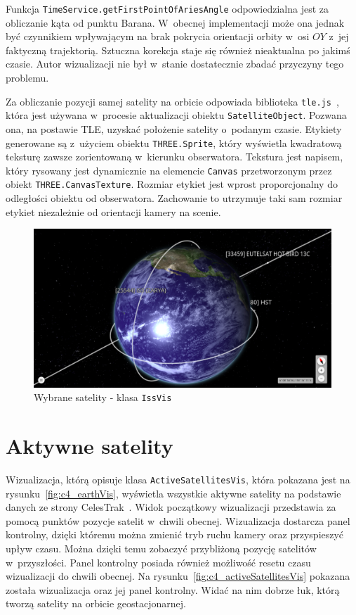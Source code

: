 Funkcja \texttt{TimeService.getFirstPointOfAriesAngle} odpowiedzialna jest za obliczanie kąta od punktu Barana. W~obecnej implementacji może ona jednak być czynnikiem wpływającym na brak pokrycia orientacji orbity w~osi $OY$ z~jej faktyczną trajektorią. Sztuczna korekcja staje się również nieaktualna po jakimś czasie. Autor wizualizacji nie był w~stanie dostatecznie zbadać przyczyny tego problemu. 

Za obliczanie pozycji samej satelity na orbicie odpowiada biblioteka \texttt{tle.js}~\cite{tle.js}, która jest używana w~procesie aktualizacji obiektu \texttt{SatelliteObject}. Pozwana ona, na postawie TLE, uzyskać położenie satelity o~podanym czasie. Etykiety generowane są z~użyciem obiektu \texttt{THREE.Sprite}, który wyświetla kwadratową teksturę zawsze zorientowaną w~kierunku obserwatora. Tekstura jest napisem, który rysowany jest dynamicznie na elemencie \texttt{Canvas} przetworzonym przez obiekt \texttt{THREE.CanvasTexture}. Rozmiar etykiet jest wprost proporcjonalny do odległości obiektu od obserwatora. Zachowanie to utrzymuje taki sam rozmiar etykiet niezależnie od orientacji kamery na scenie.

\begin{figure}
  \centering
  \includegraphics[width=\linewidth]{img/c4_issVis.png}
  \caption{Wybrane satelity - klasa \texttt{IssVis}}
  \label{fig:c4_issVis} 
\end{figure}

\section{Aktywne satelity}

Wizualizacja, którą opisuje klasa \texttt{ActiveSatellitesVis}, która pokazana jest na rysunku~\ref{fig:c4_earthVis}, wyświetla wszystkie aktywne satelity na podstawie danych ze strony CelesTrak~\cite{CelesTrak}. Widok początkowy wizualizacji przedstawia za pomocą punktów pozycje satelit w~chwili obecnej. Wizualizacja dostarcza panel kontrolny, dzięki któremu można zmienić tryb ruchu kamery oraz przyspieszyć upływ czasu. Można dzięki temu zobaczyć przybliżoną pozycję satelitów w~przyszłości. Panel kontrolny posiada również możliwość resetu czasu wizualizacji do chwili obecnej. Na rysunku~\ref{fig:c4_activeSatellitesVis} pokazana została wizualizacja oraz jej panel kontrolny. Widać na nim dobrze łuk, którą tworzą satelity na orbicie geostacjonarnej.

